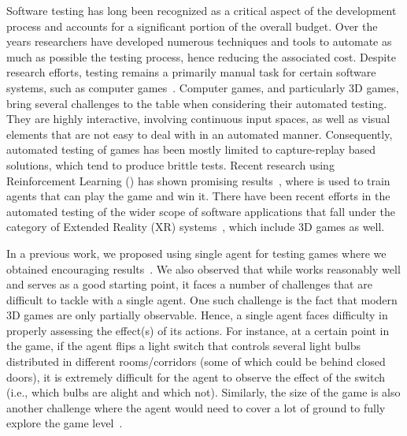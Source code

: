 Software testing has long been recognized as a critical aspect of the development process and accounts for a significant portion of the overall budget. Over the years researchers have developed numerous techniques and tools to automate as much as possible the testing process, hence reducing the associated cost. Despite research efforts, testing remains a primarily manual task for certain software systems, such as computer games~\cite{DBLP:conf/ast/PolitowskiPG21}. Computer games, and particularly 3D games, bring several challenges to the table when considering their automated testing. They are highly interactive, involving continuous input spaces, as well as visual elements that are not easy to deal with in an automated manner. Consequently, automated testing of games has been mostly limited to capture-replay based solutions, which tend to produce brittle tests. Recent research using Reinforcement Learning (\rlacronym) has shown promising results~\cite{silver2017masteringGo,mnih2013playing,openAI-dota2,DBLP:journals/tciaig/AlbaghajatiA23,politowski2022towards, DBLP:journals/tciaig/AspertiCPPS20},
where \rlacronym is used to train agents that can play the game and win it.  There have been recent efforts in the automated testing of the wider scope of software applications that fall under the category of Extended Reality (XR) systems~\cite{DBLP:conf/icst/PradaPKDVLDKDF20}, which include 3D games as well.

 In a previous work, we proposed using single agent \rlacronym for testing games where we obtained encouraging results~\cite{DBLP:conf/kbse/FerdousKPS22}. We also observed that while \rlacronym works reasonably well and serves as a good starting point, it faces a number of challenges that are difficult to tackle with a single agent. One such challenge is the fact that modern 3D games are only partially observable. Hence, a single agent faces difficulty in properly assessing the effect(s) of its actions. For instance, at a certain point in the game, if the agent flips a light switch that controls several light bulbs distributed in different rooms/corridors (some of which could be behind closed doors), it is extremely difficult for the agent to observe the effect of the switch (i.e., which bulbs are alight and which not). Similarly, the size of the game is also another challenge where the agent would need to cover a lot of ground to fully explore the game level~\cite{DBLP:conf/kbse/FerdousKPS22}.


